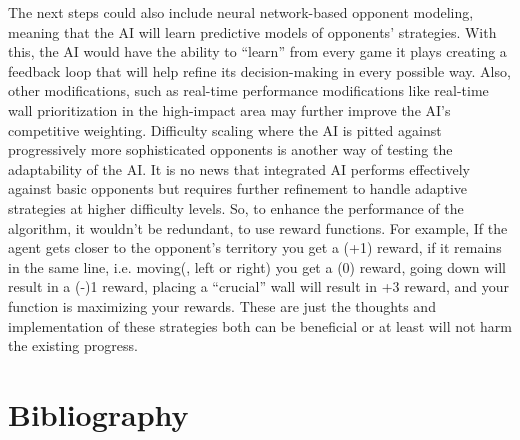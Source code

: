 \documentclass[12pt]{report}
\begin{document}
The next steps could also include neural network-based opponent modeling, meaning that the AI will learn predictive models of opponents’ strategies. With this, the AI would have the ability to “learn” from every game it plays creating a feedback loop that will help refine its decision-making in every possible way. Also, other modifications, such as real-time performance modifications like real-time wall prioritization in the high-impact area may further improve the AI’s competitive weighting. Difficulty scaling where the AI is pitted against progressively more sophisticated opponents is another way of testing the adaptability of the AI.  It is no news that integrated AI performs effectively against basic opponents but requires further refinement to handle adaptive strategies at higher difficulty levels. So, to enhance the performance of the algorithm, it wouldn’t be redundant, to use reward functions. For example, If the agent gets closer to the opponent's territory you get a (+1) reward, if it remains in the same line, i.e. moving(, left or right) you get a (0) reward, going down will result in a (-)1 reward, placing a “crucial” wall will result in +3 reward,  and your function is maximizing your rewards. These are just the thoughts and implementation of these strategies both can be beneficial or at least will not harm the existing progress.





\newpage

\chapter{Bibliography}
\end{document}
